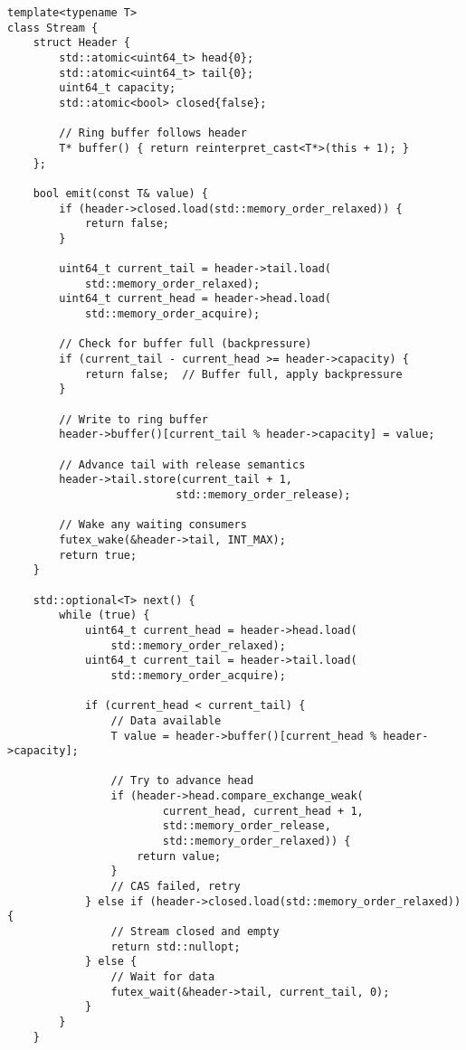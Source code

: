 \documentclass[11pt]{article}
\begin{document}
\begin{lstlisting}[caption={Lock-Free Stream with Ring Buffer}]
template<typename T>
class Stream {
    struct Header {
        std::atomic<uint64_t> head{0};
        std::atomic<uint64_t> tail{0};
        uint64_t capacity;
        std::atomic<bool> closed{false};
        
        // Ring buffer follows header
        T* buffer() { return reinterpret_cast<T*>(this + 1); }
    };
    
    bool emit(const T& value) {
        if (header->closed.load(std::memory_order_relaxed)) {
            return false;
        }
        
        uint64_t current_tail = header->tail.load(
            std::memory_order_relaxed);
        uint64_t current_head = header->head.load(
            std::memory_order_acquire);
        
        // Check for buffer full (backpressure)
        if (current_tail - current_head >= header->capacity) {
            return false;  // Buffer full, apply backpressure
        }
        
        // Write to ring buffer
        header->buffer()[current_tail % header->capacity] = value;
        
        // Advance tail with release semantics
        header->tail.store(current_tail + 1, 
                          std::memory_order_release);
        
        // Wake any waiting consumers
        futex_wake(&header->tail, INT_MAX);
        return true;
    }
    
    std::optional<T> next() {
        while (true) {
            uint64_t current_head = header->head.load(
                std::memory_order_relaxed);
            uint64_t current_tail = header->tail.load(
                std::memory_order_acquire);
            
            if (current_head < current_tail) {
                // Data available
                T value = header->buffer()[current_head % header->capacity];
                
                // Try to advance head
                if (header->head.compare_exchange_weak(
                        current_head, current_head + 1,
                        std::memory_order_release,
                        std::memory_order_relaxed)) {
                    return value;
                }
                // CAS failed, retry
            } else if (header->closed.load(std::memory_order_relaxed)) {
                // Stream closed and empty
                return std::nullopt;
            } else {
                // Wait for data
                futex_wait(&header->tail, current_tail, 0);
            }
        }
    }
    

\end{lstlisting}
\end{document}
